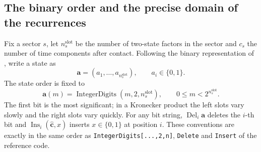 \documentclass[11pt,a4paper]{article}
\begin{document}
\subsection{The \texorpdfstring{\cite{Chen:2023eic}}{arXiv:2401.00129} binary order and the precise domain of the recurrences}

Fix a sector $s$, let $n_s^{\mathrm{slot}}$ be the number of two-state factors in the sector and $c_s$ the number of time components after contact. Following the binary representation of \cite{Chen:2023eic}, write a state as
\begin{equation}
 \bm a=(a_1,\ldots,a_{n_s^{\mathrm{slot}}}),
 \qquad a_i\in\{0,1\}.
\end{equation}
The state order is fixed to
\begin{equation}
 \bm a(m)=\operatorname{IntegerDigits}(m,2,n_s^{\mathrm{slot}}),
 \qquad 0\leq m<2^{n_s^{\mathrm{slot}}}.
 \label{eq:binary-state-order}
\end{equation}
The first bit is the most significant; in a Kronecker product the left slots vary slowly and the right slots vary quickly. For any bit string, $\operatorname{Del}_i\bm a$ deletes the $i$-th bit and $\operatorname{Ins}_i(\widehat{\bm c},x)$ inserts $x\in\{0,1\}$ at position $i$. These conventions are exactly in the same order as \texttt{IntegerDigits[...,2,n]}, \texttt{Delete} and \texttt{Insert} of the reference code.
\end{document}

